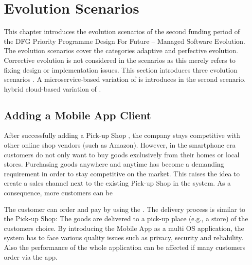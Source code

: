 
\chapter{Evolution Scenarios}
\label{c:evolution scenarios}

This chapter introduces the evolution scenarios of the second funding period of the DFG Priority Programme
Design For Future -- Managed Software Evolution.
The evolution scenarios cover the categories adaptive and perfective evolution. Corrective evolution is not considered in the scenarios as this merely refers to fixing design or implementation issues.
This section introduces three evolution scenarios .
A microservice-based variation of \CoCoME is introduces in the second scenario.
  hybrid cloud-based variation of \CoCoME.

\section{Adding a Mobile App Client}
After successfully adding a Pick-up Shop
, the \CoCoME company stays competitive with other online shop vendors (such as Amazon). 
However, in the smartphone era customers do not only want to buy goods exclusively from their homes or local stores. %
Purchasing goods anywhere and anytime has become a demanding requirement in order to stay competitive on the market. %
This raises the idea to create a  sales channel next to the existing Pick-up Shop  in the \CoCoME system. 
As a consequence, more customers can be  

The customer can order and pay by using the . 
The delivery process is similar to the Pick-up Shop: The goods are delivered to a pick-up place (e.g., a store) of the customers choice.
By introducing the Mobile App as a multi OS application, the \CoCoME system has to face various quality issues such as privacy, security and reliability. 
Also the performance of the whole application can be affected if many customers order via the app.

